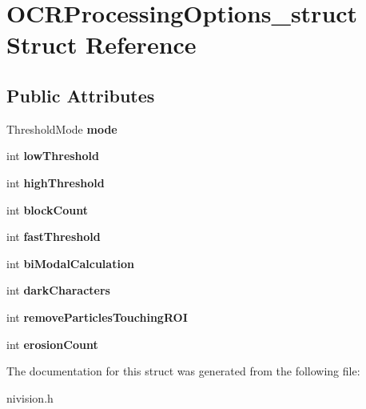 \hypertarget{structOCRProcessingOptions__struct}{\section{\-O\-C\-R\-Processing\-Options\-\_\-struct \-Struct \-Reference}
\label{structOCRProcessingOptions__struct}
}
\subsection*{\-Public \-Attributes}
\begin{DoxyCompactItemize}
\item 
\hypertarget{structOCRProcessingOptions__struct_a481cb99e45610ff4b87864db08a89af2}{\-Threshold\-Mode {\bfseries mode}}\label{structOCRProcessingOptions__struct_a481cb99e45610ff4b87864db08a89af2}

\item 
\hypertarget{structOCRProcessingOptions__struct_aa1f5c73c9510060aff2b8787642d21f0}{int {\bfseries low\-Threshold}}\label{structOCRProcessingOptions__struct_aa1f5c73c9510060aff2b8787642d21f0}

\item 
\hypertarget{structOCRProcessingOptions__struct_a13c778893b4c224bf84fe5b9c86dbca8}{int {\bfseries high\-Threshold}}\label{structOCRProcessingOptions__struct_a13c778893b4c224bf84fe5b9c86dbca8}

\item 
\hypertarget{structOCRProcessingOptions__struct_a0a1947d104fbc507b18a7ae28a81b13f}{int {\bfseries block\-Count}}\label{structOCRProcessingOptions__struct_a0a1947d104fbc507b18a7ae28a81b13f}

\item 
\hypertarget{structOCRProcessingOptions__struct_a6f8d4a011352194b8a204a79213dea4e}{int {\bfseries fast\-Threshold}}\label{structOCRProcessingOptions__struct_a6f8d4a011352194b8a204a79213dea4e}

\item 
\hypertarget{structOCRProcessingOptions__struct_a32a9873e5013d4d02a7081c19bf1f7d4}{int {\bfseries bi\-Modal\-Calculation}}\label{structOCRProcessingOptions__struct_a32a9873e5013d4d02a7081c19bf1f7d4}

\item 
\hypertarget{structOCRProcessingOptions__struct_add7ba8dc8bbded4deca7bef3f4a9da3e}{int {\bfseries dark\-Characters}}\label{structOCRProcessingOptions__struct_add7ba8dc8bbded4deca7bef3f4a9da3e}

\item 
\hypertarget{structOCRProcessingOptions__struct_ad069d91f2b641667c3dcc70db64735a3}{int {\bfseries remove\-Particles\-Touching\-R\-O\-I}}\label{structOCRProcessingOptions__struct_ad069d91f2b641667c3dcc70db64735a3}

\item 
\hypertarget{structOCRProcessingOptions__struct_a80f9275b34fa855a4aa752458f27542d}{int {\bfseries erosion\-Count}}\label{structOCRProcessingOptions__struct_a80f9275b34fa855a4aa752458f27542d}

\end{DoxyCompactItemize}


\-The documentation for this struct was generated from the following file\-:\begin{DoxyCompactItemize}
\item 
nivision.\-h\end{DoxyCompactItemize}
